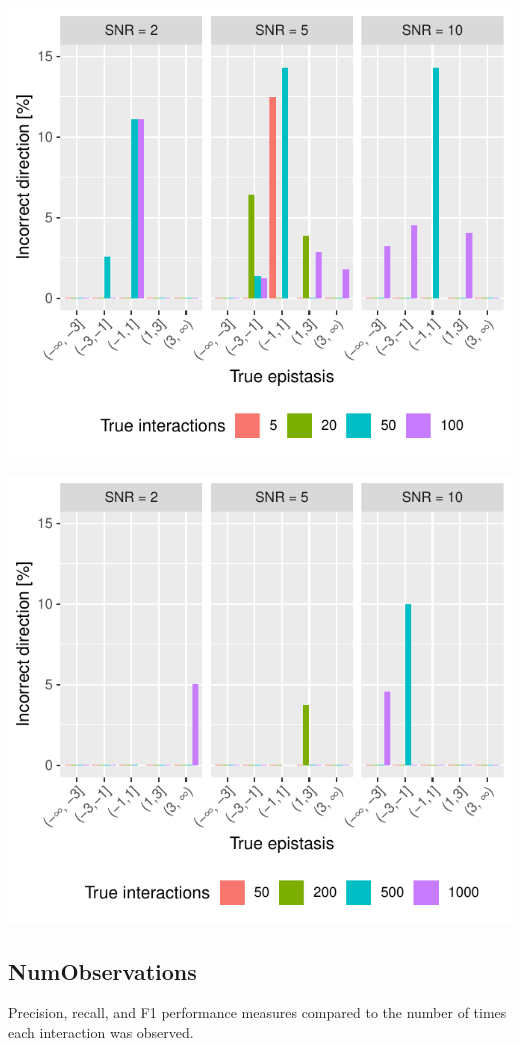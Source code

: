 \begin{minipage}{\linewidth}
	\centering
	\includegraphics[width=0.5\linewidth]{"output/FXstrength_direction_n1000_tno_mult1_"}%
\end{minipage}
\begin{minipage}{\linewidth}
	\centering
	\includegraphics[width=0.5\linewidth]{"output/FXstrength_direction_n10000_tno_mult10_"}%
\end{minipage}




\subsection{NumObservations}
Precision, recall, and F1 performance measures compared to the number of times each interaction was observed.

